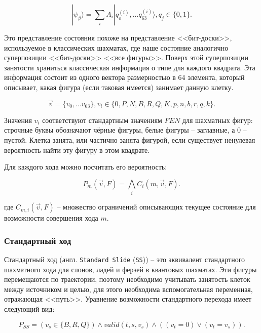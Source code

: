 \begin{equation}
	|\psi_\beta\rangle = \sum\limits_{i}A_i|q_o^{(i)},...q_{63}^{(i)}\rangle, q_j\in\{0, 1\}.
\end{equation}

Это представление состояния похоже на представление <<бит-доски>>, используемое в классических шахматах\cite{fide}, где наше состояние аналогично суперпозиции <<бит-доски>> <<все фигуры>>. Поверх этой суперпозиции занятости храниться классическая информация о типе для каждого квадрата. Эта информация состоит из одного вектора размерностью в 64 элемента, который описывает, какая фигура (если таковая имеется) занимает данную клетку.

\begin{equation}
	\vec{v} = \{v_0,...v_{63}\},v_i\in\{0, P, N, B, R, Q, K, p, n, b, r, q, k\}.
\end{equation}

Значения $v_i$ соответствуют стандартным значениям $FEN$ для шахматных фигур\cite{fen}: строчные буквы обозначают чёрные фигуры, белые фигуры -- заглавные, а 0 -- пустой. Клетка занята, или частично занята фигурой, если существует ненулевая вероятность найти эту фигуру в этом квадрате.

Для каждого хода можно посчитать его вероятность:

\begin{equation}\label{eq:chessprob}
	P_m(\vec{v},F)=\bigwedge\limits_{i} C_i(m,\vec{v}, F).
\end{equation}

где $C_{m,i}(\vec{v} , F)$ -- множество ограничений описывающих текущее состояние для возможности совершения хода $m$.

\subsubsection{Стандартный ход}

Стандартный ход (англ. \texttt{Standard Slide} (\texttt{SS})) -- это эквивалент стандартного шахматного хода для слонов, ладей и ферзей в квантовых шахматах. Эти фигуры перемещаются по траектории, поэтому необходимо учитывать занятость клеток между источником и целью, для этого необходима вспомогательная переменная, отражающая <<путь>>. Уравнение возможности стандартного перехода имеет следующий вид:

\begin{equation}\label{eq:chessstandard}
	P_{SS} = (v_s \in \{B,R,Q\}) \wedge valid(t,s,v_s) \wedge ((v_t = 0) \vee (v_t = v_s)).
\end{equation}

